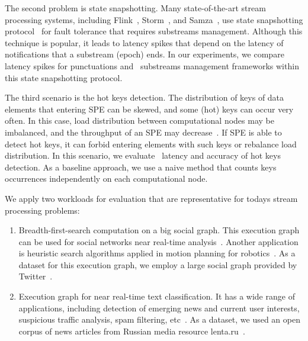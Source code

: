 The second problem is state snapshotting. Many state-of-the-art stream processing systems, including Flink~\cite{Carbone:2017:SMA:3137765.3137777}, Storm~\cite{Toshniwal:2014:STO:2588555.2595641}, and Samza~\cite{Noghabi:2017:SSS:3137765.3137770}, use state snapshotting protocol~\cite{2015arXiv150608603C} for fault tolerance that requires substreams management. Although this technique is popular, it leads to latency spikes that depend on the latency of notifications that a substream (epoch) ends. In our experiments, we compare latency spikes for punctuations and \tracker\ substreams management frameworks within this state snapshotting protocol.

The third scenario is the hot keys detection. The distribution of keys of data elements that entering SPE can be skewed, and some (hot) keys can occur very often. In this case, load distribution between computational nodes may be imbalanced, and the throughput of an SPE may decrease~\cite{liao2019efficient}. If SPE is able to detect hot keys, it can forbid entering elements with such keys or rebalance load distribution. In this scenario, we evaluate \tracker\ latency and accuracy of hot keys detection. As a baseline approach, we use a naive method that counts keys occurrences independently on each computational node.

We apply two workloads for evaluation that are representative for todays stream processing problems:
\begin{enumerate}
    \item Breadth-first-search computation on a big social graph. This execution graph can be used for social networks near real-time analysis~\cite{wang2011understanding}. Another application is heuristic search algorithms applied in motion planning for robotics~\cite{sud2007real}. As a dataset for this execution graph, we employ a large social graph provided by Twitter~\cite{kwak2010twitter}. 
    \item Execution graph for near real-time text classification. It has a wide range of applications, including detection of emerging news and current user interests, suspicious traffic analysis, spam filtering, etc~\cite{webirte}. As a dataset, we used an open corpus of news articles from Russian media resource lenta.ru~\cite{lentaru}.
\end{enumerate}


